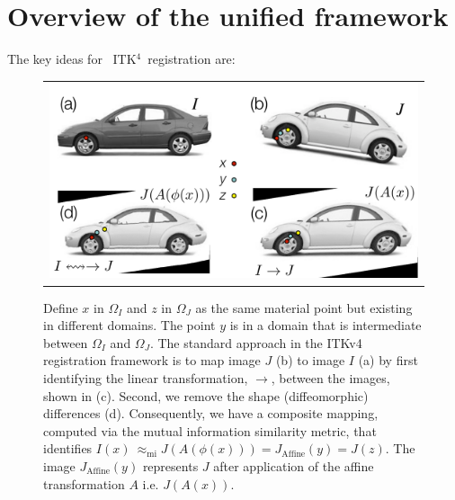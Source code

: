 \documentclass{frontiersSCNS}
\newcommand{\tk}{~ITK$^{\text{4}}$~}
\begin{document}
\section{Overview of the unified framework}
The key ideas for \tk registration are:
\begin{figure}[t]
\begin{center}
\begin{tabular}{c}
\includegraphics[width=4.5in]{figs/RegistrationNomenclature.pdf}
\end{tabular}
\caption{\baselineskip 12pt \small Define $x$ in $\Omega_I$ and $z$ in
  $\Omega_J$ as the same material point but existing in different
  domains.  The point $y$ is in a domain that is intermediate between
  $\Omega_I$ and $\Omega_J$.  The standard approach in the ITKv4
  registration framework is to map image $J$ (b) to image $I$ (a) by first
  identifying the linear transformation, $\rightarrow$, between the images, shown in (c).  Second, we remove the shape (diffeomorphic)
  differences (d).  Consequently, we have a composite mapping, computed via the
  mutual information similarity metric, that identifies
  $I(x) ~\approx_\text{mi}  J(A(\phi(x))) =  J_\text{Affine}(y) = J(z)
  $. The image $J_\text{Affine}(y)$
  represents $J$ after application of the affine transformation $A$
  i.e. $J(A(x))$.}
\label{fig:composite}
\end{center}
\end{figure}
\end{document}
